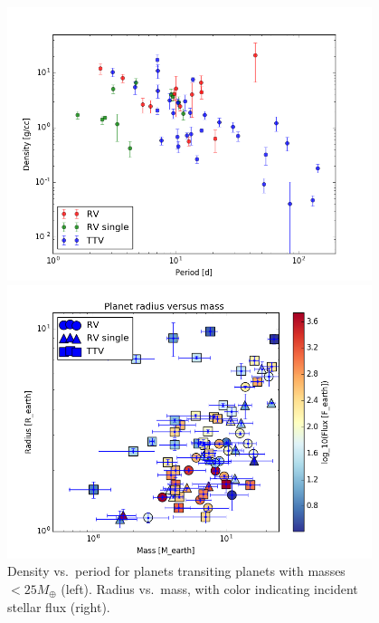\documentclass[graybox,natbib,nosecnum]{svmult}
\begin{document}
\begin{figure}
\centerline{
\includegraphics[width=0.95\textwidth]{density_vs_period_errors.png}}
\centerline{
\includegraphics[width=0.95\textwidth]{mass_radius_flux.png}}
\caption{Density vs.\ period for planets transiting planets with masses $<25 M_\oplus$ (left).  Radius
vs.\ mass, with color indicating incident stellar flux (right).}
\label{fig:density_period}
\end{figure}
\end{document}
